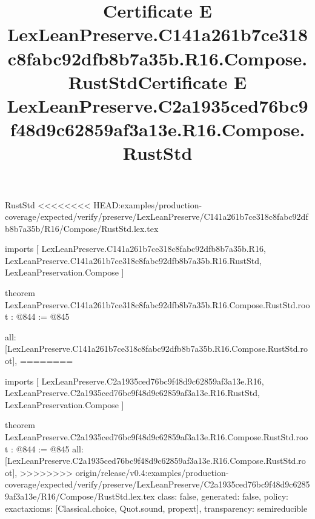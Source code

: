 \begin{lexlean}{RustStd}
<<<<<<<< HEAD:examples/production-coverage/expected/verify/preserve/LexLeanPreserve/C141a261b7ce318c8fabc92dfb8b7a35b/R16/Compose/RustStd.lex.tex
\title{Certificate E LexLeanPreserve.C141a261b7ce318c8fabc92dfb8b7a35b.R16.Compose.RustStd}
\begin{coremodule}
imports [
  LexLeanPreserve.C141a261b7ce318c8fabc92dfb8b7a35b.R16,
  LexLeanPreserve.C141a261b7ce318c8fabc92dfb8b7a35b.R16.RustStd,
  LexLeanPreservation.Compose
]

theorem LexLeanPreserve.C141a261b7ce318c8fabc92dfb8b7a35b.R16.Compose.RustStd.root : @844 := @845 {
  all: [LexLeanPreserve.C141a261b7ce318c8fabc92dfb8b7a35b.R16.Compose.RustStd.root],
========
\title{Certificate E LexLeanPreserve.C2a1935ced76bc9f48d9c62859af3a13e.R16.Compose.RustStd}
\begin{coremodule}
imports [
  LexLeanPreserve.C2a1935ced76bc9f48d9c62859af3a13e.R16,
  LexLeanPreserve.C2a1935ced76bc9f48d9c62859af3a13e.R16.RustStd,
  LexLeanPreservation.Compose
]

theorem LexLeanPreserve.C2a1935ced76bc9f48d9c62859af3a13e.R16.Compose.RustStd.root : @844 := @845 {
  all: [LexLeanPreserve.C2a1935ced76bc9f48d9c62859af3a13e.R16.Compose.RustStd.root],
>>>>>>>> origin/release/v0.4:examples/production-coverage/expected/verify/preserve/LexLeanPreserve/C2a1935ced76bc9f48d9c62859af3a13e/R16/Compose/RustStd.lex.tex
  class: false,
  generated: false,
  policy: exact{axioms: [Classical.choice, Quot.sound, propext]},
  transparency: semireducible
}


\end{coremodule}}
\end{coremodule}
\end{lexlean}
